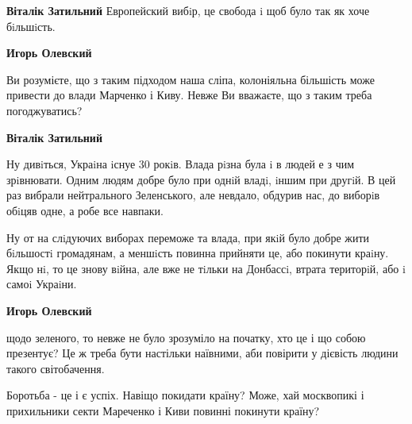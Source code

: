 \begin{itemize}
\begin{itemize}
\begin{itemize}
\textbf{Віталік Затильний}
Европейский вибiр, це свобода i щоб було так як хоче бiльшiсть.

 
\textbf{Игорь Олевский} 

Ви розумієте, що з таким підходом наша сліпа, колоніяльна більшість може
привести до влади Марченко і Киву. Невже Ви вважаєте, що з таким треба
погоджуватись?

 
\textbf{Віталік Затильний}

Ну дивiться, Украiна iснуе 30 рокiв. Влада рiзна була i в людей е з чим
зрiвнювати. Одним людям добре було при однiй владi, iншим при другiй. В цей раз
вибрали нейтрального Зеленського, але невдало, обдурив нас, до виборiв обiцяв
одне, а робе все навпаки.

Ну от на слiдуючих виборах переможе та влада, при якiй було добре жити
бiльшостi громадянам, а меншiсть повинна прийняти це, або покинути краiну. Якщо
нi, то це знову вiйна, але вже не тiльки на Донбассi, втрата територiй, або i
самоi Украiни.

 
\textbf{Игорь Олевский} 

щодо зеленого, то невже не було зрозуміло на початку, хто це і що собою
презентує? Це ж треба бути настільки наївними, аби повірити у дієвість людини
такого світобачення.

Боротьба - це і є успіх. Навіщо покидати країну? Може, хай москвопикі і
прихильники секти Мареченко і Киви повинні покинути країну?

\end{itemize}

\end{itemize}


\end{itemize}

